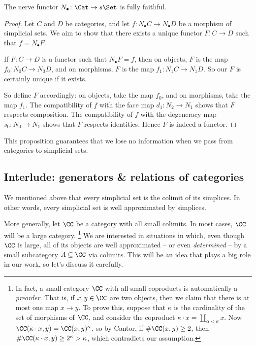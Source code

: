 \begin{proposition}
  The nerve functor $N_\bullet \colon \Cat \to s\Set$ is fully faithful.
\end{proposition}

\begin{proof}
  Let $C$ and $D$ be categories, and let $f \colon N_\bullet C \to N_\bullet D$ be a morphism of simplicial sets.
  We aim to show that there exists a unique functor $F \colon C \to D$ such that $f = N_\bullet F$.

  If $F \colon C \to D$ is a functor such that $N_\bullet F=f$, then
  on objects, $F$ is the map $f_0 \colon N_0C \to N_0D$, and
  on morphisms, $F$ is the map $f_1 \colon N_1C \to N_1D$.
  So our $F$ is certainly unique if it exists.

  So define $F$ accordingly: on objects, take the map $f_0$, and on morphisms, take the map $f_1$.
  The compatibility of $f$ with the face map $d_1 \colon N_2 \to N_1$ shows that $F$ respects composition.
  The compatibility of $f$ with the degeneracy map $s_0 \colon N_0 \to N_1$ shows that $F$ respects identities.
  Hence $F$ is indeed a functor.
\end{proof}

\noindent This proposition guarantees that we lose no information when we pass from categories to simplicial sets.

\subsection{Interlude: generators \& relations of categories \inc}%
\label{sub:generatorsrelations}
We mentioned above that every simplicial set is the colimit of its simplices.
In other words, every simplicial set is well approximated by simplices.

More generally, let $\CC$ be a category with all small colimits.
In most cases, $\CC$ will be a large category.%
\footnote{
  In fact, a small category $\CC$ with all small coproducts is automatically a \emph{preorder}.
  That is, if $x,y \in \CC$ are two objects, then we claim that there is at most one map $x \to y$.
  To prove this, suppose that $\kappa$ is the cardinality of the set of morphisms of $\CC$, and consider the coproduct $\kappa \cdot x = \coprod_{\alpha < \kappa} x$.
  Now $\CC(\kappa \cdot x, y) = \CC(x,y)^{\kappa}$, so by Cantor, if $\#\CC(x,y) \geq 2$, then $\#\CC(\kappa\cdot x, y) \geq 2^\kappa > \kappa$, which contradicts our assumption.
}
We are interested in situations in which, even though $\CC$ is large, all of its objects are well approximated -- or even \emph{determined} -- by a small subcategory $A \subseteq \CC$ via colimits.
This will be an idea that plays a big role in our work, so let's discuss it carefully.

